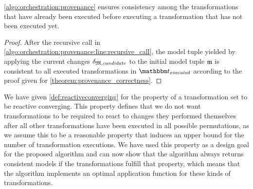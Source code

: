 \begin{theorem}
    \autoref{algo:orchestration:provenance} ensures consistency among the transformations that have already been executed before executing a transformation that has not been executed yet.
\end{theorem}
\begin{proof}
	After the recursive call in \autoref{algo:orchestration:provenance:line:recursive_call}, the model tuple yielded by applying the current changes $\changetuple{\metamodeltuple{M},\mathvariable{candidate}}$ to the initial model tuple $\modeltuple{m}$ is consistent to all executed transformations in $\provalgexecuted$ according to the proof given for \autoref{theorem:provenance_correctness}.
\end{proof}	

We have given \autoref{def:reactiveconverging} for the property of a transformation set to be reactive converging.
This property defines that we do not want transformations to be required to react to changes they performed themselves after all other transformations have been executed in all possible permutations, as we assume this to be a reasonable property that induces an upper bound for the number of transformation executions.
We have used this property as a design goal for the proposed algorithm and can now show that the algorithm always returns consistent models if the transformations fulfill that property, which means that the algorithm implements an optimal application function for these kinds of transformations.

